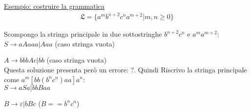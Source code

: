 \documentclass[a4paper, 10pt]{report}
\begin{document}
\noindent \underline{Esempio: costruire la grammatica}
\begin{align*}
\mathfrak{L} = \{a^mb^{n+2}c^na^{m+2} | m, n \ge 0\}
\end{align*}

\noindent Scompongo la stringa principale in due sottostringhe $b^{n+2}c^n$ e $a^ma^{m+2}$:\\

$S \rightarrow aAaaa | Aaa$ (caso stringa vuota)

$A \rightarrow bbbAc | bb$ (caso stringa vuota)\\

\noindent Questa soluzione presenta però un errore: ?. Quindi Riscrivo la stringa principale come $a^m[bb(b^nc^n)aa]a^n$:\\

$S \rightarrow aSa | bbBaa$

$B \rightarrow \varepsilon | bBc$ ($B == b^nc^n$)
\end{document}
